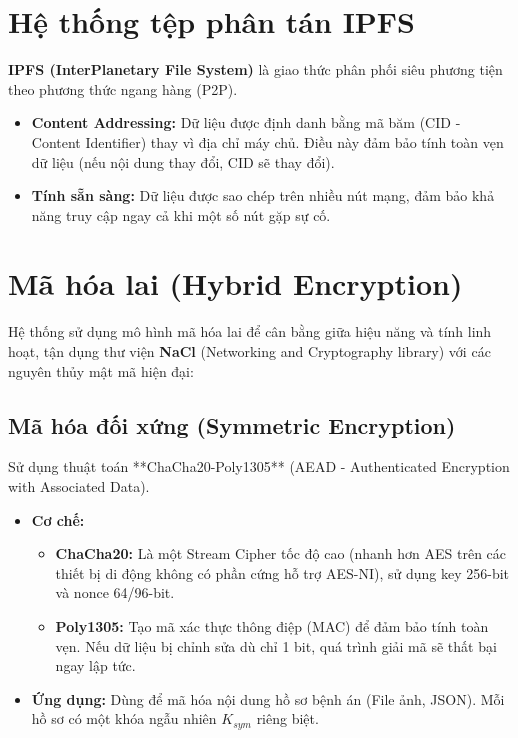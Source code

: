 \documentclass[12pt,a4paper]{report}
\begin{document}
\section{Hệ thống tệp phân tán IPFS}
\textbf{IPFS (InterPlanetary File System)} là giao thức phân phối siêu phương tiện theo phương thức ngang hàng (P2P).
\begin{itemize}
    \item \textbf{Content Addressing:} Dữ liệu được định danh bằng mã băm (CID - Content Identifier) thay vì địa chỉ máy chủ. Điều này đảm bảo tính toàn vẹn dữ liệu (nếu nội dung thay đổi, CID sẽ thay đổi).
    \item \textbf{Tính sẵn sàng:} Dữ liệu được sao chép trên nhiều nút mạng, đảm bảo khả năng truy cập ngay cả khi một số nút gặp sự cố.
\end{itemize}

\section{Mã hóa lai (Hybrid Encryption)}
Hệ thống sử dụng mô hình mã hóa lai để cân bằng giữa hiệu năng và tính linh hoạt, tận dụng thư viện \textbf{NaCl} (Networking and Cryptography library) với các nguyên thủy mật mã hiện đại:

\subsection{Mã hóa đối xứng (Symmetric Encryption)}
Sử dụng thuật toán **ChaCha20-Poly1305** (AEAD - Authenticated Encryption with Associated Data).
\begin{itemize}
    \item \textbf{Cơ chế:}
    \begin{itemize}
        \item \textbf{ChaCha20:} Là một Stream Cipher tốc độ cao (nhanh hơn AES trên các thiết bị di động không có phần cứng hỗ trợ AES-NI), sử dụng key 256-bit và nonce 64/96-bit.
        \item \textbf{Poly1305:} Tạo mã xác thực thông điệp (MAC) để đảm bảo tính toàn vẹn. Nếu dữ liệu bị chỉnh sửa dù chỉ 1 bit, quá trình giải mã sẽ thất bại ngay lập tức.
    \end{itemize}
    \item \textbf{Ứng dụng:} Dùng để mã hóa nội dung hồ sơ bệnh án (File ảnh, JSON). Mỗi hồ sơ có một khóa ngẫu nhiên $K_{sym}$ riêng biệt.
\end{itemize}
\end{document}
